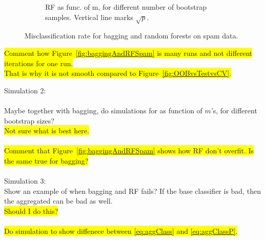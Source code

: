 \begin{figure}[h!]
\begin{subfigure}[b]{0.48\textwidth}
    \caption{RF as func. of m, for different number of bootstrap samples. Vertical line marks $\sqrt{p}$.}
    \label{fig:RFSpam}
  \end{subfigure}
  \vspace{1\baselineskip}
  \caption{Misclassification rate for bagging and random forests on spam data.}
  \label{fig:baggAndRF}
\end{figure}
\colorbox{yellow}{Comment how Figure~\ref{fig:baggingAndRFSpam} is many runs and not different iterations for one run.}
\\\colorbox{yellow}{That is why it is not smooth compared to Figure~\ref{fig:OOBvsTestvsCV}.}


Simulation 2: \\
\\
Maybe together with bagging, do simulations for as function of $m$'s, for different bootstrap sizes? \\
\colorbox{yellow}{Not sure what is best here.}\\
\\
\colorbox{yellow}{Comment that Figure~\ref{fig:baggingAndRFSpam} shows how RF don't overfit. Is the same true for bagging?}\\
\\
Simulation 3: \\
Show an example of when bagging and RF fails? If the base classifier is bad, then the aggregated can be bad as well.\\
\colorbox{yellow}{Should I do this?}\\
\\
\colorbox{yellow}{Do simulation to show diffenece between \eqref{eq:aggClass} and \eqref{eq:aggClassP}.}


